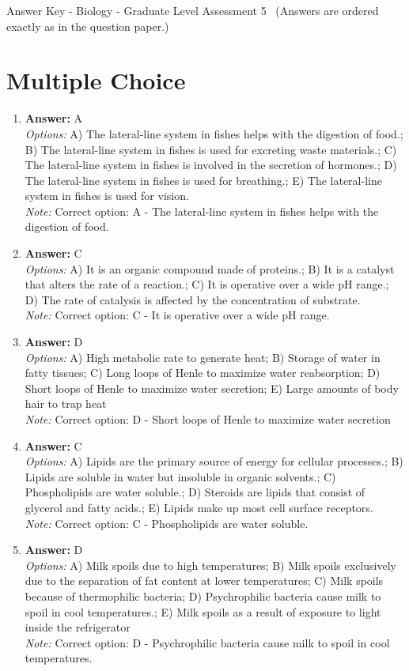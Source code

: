 \documentclass[12pt]{article}
\begin{document}
\begin{center}
Answer Key - Biology - Graduate Level Assessment 5 \
\small (Answers are ordered exactly as in the question paper.)
\end{center}

\section*{Multiple Choice}
\begin{enumerate}[label=\arabic*.]
\item \textbf{Answer:} A
\\ \textit{Options:} A) The lateral-line system in fishes helps with the digestion of food.; B) The lateral-line system in fishes is used for excreting waste materials.; C) The lateral-line system in fishes is involved in the secretion of hormones.; D) The lateral-line system in fishes is used for breathing.; E) The lateral-line system in fishes is used for vision.
\\ \textit{Note:} Correct option: A - The lateral-line system in fishes helps with the digestion of food.
\item \textbf{Answer:} C
\\ \textit{Options:} A) It is an organic compound made of proteins.; B) It is a catalyst that alters the rate of a reaction.; C) It is operative over a wide pH range.; D) The rate of catalysis is affected by the concentration of substrate.
\\ \textit{Note:} Correct option: C - It is operative over a wide pH range.
\item \textbf{Answer:} D
\\ \textit{Options:} A) High metabolic rate to generate heat; B) Storage of water in fatty tissues; C) Long loops of Henle to maximize water reabsorption; D) Short loops of Henle to maximize water secretion; E) Large amounts of body hair to trap heat
\\ \textit{Note:} Correct option: D - Short loops of Henle to maximize water secretion
\item \textbf{Answer:} C
\\ \textit{Options:} A) Lipids are the primary source of energy for cellular processes.; B) Lipids are soluble in water but insoluble in organic solvents.; C) Phospholipids are water soluble.; D) Steroids are lipids that consist of glycerol and fatty acids.; E) Lipids make up most cell surface receptors.
\\ \textit{Note:} Correct option: C - Phospholipids are water soluble.
\item \textbf{Answer:} D
\\ \textit{Options:} A) Milk spoils due to high temperatures; B) Milk spoils exclusively due to the separation of fat content at lower temperatures; C) Milk spoils because of thermophilic bacteria; D) Psychrophilic bacteria cause milk to spoil in cool temperatures.; E) Milk spoils as a result of exposure to light inside the refrigerator
\\ \textit{Note:} Correct option: D - Psychrophilic bacteria cause milk to spoil in cool temperatures.
\end{enumerate}
\end{document}
